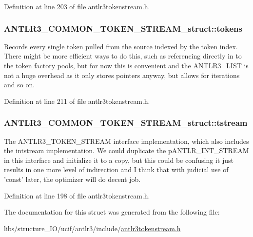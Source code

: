 Definition at line 203 of file antlr3tokenstream.\-h.

\hypertarget{struct_a_n_t_l_r3___c_o_m_m_o_n___t_o_k_e_n___s_t_r_e_a_m__struct_ab1fb3f1cecceebdc61d838277670a7f0}{
\subsubsection[{tokens}]{ A\-N\-T\-L\-R3\-\_\-\-C\-O\-M\-M\-O\-N\-\_\-\-T\-O\-K\-E\-N\-\_\-\-S\-T\-R\-E\-A\-M\-\_\-struct\-::tokens}}\label{struct_a_n_t_l_r3___c_o_m_m_o_n___t_o_k_e_n___s_t_r_e_a_m__struct_ab1fb3f1cecceebdc61d838277670a7f0}
Records every single token pulled from the source indexed by the token index. There might be more efficient ways to do this, such as referencing directly in to the token factory pools, but for now this is convenient and the A\-N\-T\-L\-R3\-\_\-\-L\-I\-S\-T is not a huge overhead as it only stores pointers anyway, but allows for iterations and so on. 

Definition at line 211 of file antlr3tokenstream.\-h.

\hypertarget{struct_a_n_t_l_r3___c_o_m_m_o_n___t_o_k_e_n___s_t_r_e_a_m__struct_ad4ac4cf969cb48478aa44f7c708226e2}{
\subsubsection[{tstream}]{ A\-N\-T\-L\-R3\-\_\-\-C\-O\-M\-M\-O\-N\-\_\-\-T\-O\-K\-E\-N\-\_\-\-S\-T\-R\-E\-A\-M\-\_\-struct\-::tstream}}\label{struct_a_n_t_l_r3___c_o_m_m_o_n___t_o_k_e_n___s_t_r_e_a_m__struct_ad4ac4cf969cb48478aa44f7c708226e2}
The A\-N\-T\-L\-R3\-\_\-\-T\-O\-K\-E\-N\-\_\-\-S\-T\-R\-E\-A\-M interface implementation, which also includes the intstream implementation. We could duplicate the p\-A\-N\-T\-L\-R\-\_\-\-I\-N\-T\-\_\-\-S\-T\-R\-E\-A\-M in this interface and initialize it to a copy, but this could be confusing it just results in one more level of indirection and I think that with judicial use of 'const' later, the optimizer will do decent job. 

Definition at line 198 of file antlr3tokenstream.\-h.



The documentation for this struct was generated from the following file\-:\begin{DoxyCompactItemize}
\item 
libs/structure\-\_\-\-I\-O/ucif/antlr3/include/\hyperlink{antlr3tokenstream_8h}{antlr3tokenstream.\-h}\end{DoxyCompactItemize}
